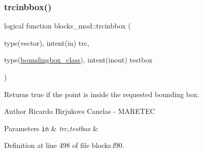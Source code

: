 \subsubsection{\texorpdfstring{trcinbbox()}{trcinbbox()}}
{\footnotesize\ttfamily logical function blocks\+\_\+mod\+::trcinbbox (\begin{DoxyParamCaption}\item[{type(vector), intent(in)}]{trc,  }\item[{type(\mbox{\hyperlink{structboundingbox__mod_1_1boundingbox__class}{boundingbox\+\_\+class}}), intent(inout)}]{testbox }\end{DoxyParamCaption})\hspace{0.3cm}{\ttfamily [private]}}



Returns true if the point is inside the requested bounding box. 

\begin{DoxyAuthor}{Author}
Ricardo Birjukovs Canelas -\/ M\+A\+R\+E\+T\+EC 
\end{DoxyAuthor}

\begin{DoxyParams}[1]{Parameters}
\mbox{\tt in}  & {\em trc,testbox} & \\
\hline
\end{DoxyParams}


Definition at line 498 of file blocks.\+f90.


